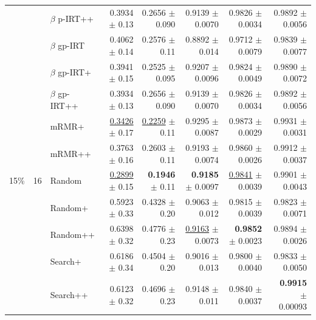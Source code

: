 \begin{longtable}{llp{}rrrrr}
 &  & $\beta$ p-IRT++ & 0.3934 {\scriptsize $\pm$ 0.13} & 0.2656 {\scriptsize $\pm$ 0.090} & 0.9139 {\scriptsize $\pm$ 0.0070} & 0.9826 {\scriptsize $\pm$ 0.0034} & 0.9892 {\scriptsize $\pm$ 0.0056} \\
 &  & $\beta$ gp-IRT & 0.4062 {\scriptsize $\pm$ 0.14} & 0.2576 {\scriptsize $\pm$ 0.11} & 0.8892 {\scriptsize $\pm$ 0.014} & 0.9712 {\scriptsize $\pm$ 0.0079} & 0.9839 {\scriptsize $\pm$ 0.0077} \\
 &  & $\beta$ gp-IRT+ & 0.3941 {\scriptsize $\pm$ 0.15} & 0.2525 {\scriptsize $\pm$ 0.095} & 0.9207 {\scriptsize $\pm$ 0.0096} & 0.9824 {\scriptsize $\pm$ 0.0049} & 0.9890 {\scriptsize $\pm$ 0.0072} \\
 &  & $\beta$ gp-IRT++ & 0.3934 {\scriptsize $\pm$ 0.13} & 0.2656 {\scriptsize $\pm$ 0.090} & 0.9139 {\scriptsize $\pm$ 0.0070} & 0.9826 {\scriptsize $\pm$ 0.0034} & 0.9892 {\scriptsize $\pm$ 0.0056} \\
 &  & mRMR+ & \underline{0.3426} {\scriptsize $\pm$ 0.17} & \underline{0.2259} {\scriptsize $\pm$ 0.11} & 0.9295 {\scriptsize $\pm$ 0.0087} & 0.9873 {\scriptsize $\pm$ 0.0029} & 0.9931 {\scriptsize $\pm$ 0.0031} \\
 &  & mRMR++ & 0.3763 {\scriptsize $\pm$ 0.16} & 0.2603 {\scriptsize $\pm$ 0.11} & 0.9193 {\scriptsize $\pm$ 0.0074} & 0.9860 {\scriptsize $\pm$ 0.0026} & 0.9912 {\scriptsize $\pm$ 0.0037} \\
\midrule
15\% & 16 & Random & \underline{0.2899} {\scriptsize $\pm$ 0.15} & \textbf{0.1946} {\scriptsize $\pm$ 0.11} & \textbf{0.9185} {\scriptsize $\pm$ 0.0097} & \underline{0.9841} {\scriptsize $\pm$ 0.0039} & 0.9901 {\scriptsize $\pm$ 0.0043} \\
 &  & Random+ & 0.5923 {\scriptsize $\pm$ 0.33} & 0.4328 {\scriptsize $\pm$ 0.20} & 0.9063 {\scriptsize $\pm$ 0.012} & 0.9815 {\scriptsize $\pm$ 0.0039} & 0.9823 {\scriptsize $\pm$ 0.0071} \\
 &  & Random++ & 0.6398 {\scriptsize $\pm$ 0.32} & 0.4776 {\scriptsize $\pm$ 0.23} & \underline{0.9163} {\scriptsize $\pm$ 0.0073} & \textbf{0.9852} {\scriptsize $\pm$ 0.0023} & 0.9894 {\scriptsize $\pm$ 0.0026} \\
 &  & Search+ & 0.6186 {\scriptsize $\pm$ 0.34} & 0.4504 {\scriptsize $\pm$ 0.20} & 0.9016 {\scriptsize $\pm$ 0.013} & 0.9800 {\scriptsize $\pm$ 0.0040} & 0.9833 {\scriptsize $\pm$ 0.0050} \\
 &  & Search++ & 0.6123 {\scriptsize $\pm$ 0.32} & 0.4696 {\scriptsize $\pm$ 0.23} & 0.9148 {\scriptsize $\pm$ 0.011} & 0.9840 {\scriptsize $\pm$ 0.0037} & \textbf{0.9915} {\scriptsize $\pm$ 0.00093} \\

\end{longtable}
